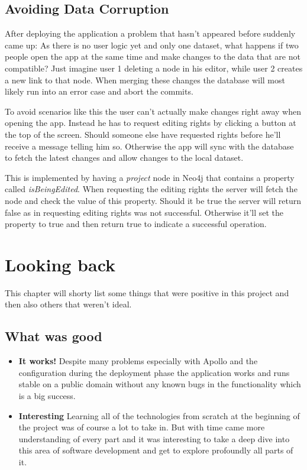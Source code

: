 \section{Avoiding Data Corruption}
After deploying the application a problem that hasn't appeared before suddenly came up: As there is no user logic yet and only one dataset, what happens if two people open the app at the same time and make changes to the data that are not compatible? Just imagine user 1 deleting a node in his editor, while user 2 creates a new link to that node. When merging these changes the database will most likely run into an error case and abort the commits.

To avoid scenarios like this the user can't actually make changes right away when opening the app. Instead he has to request editing rights by clicking a button at the top of the screen. Should someone else have requested rights before he'll receive a message telling him so. Otherwise the app will sync with the database to fetch the latest changes and allow changes to the local dataset.

This is implemented by having a \emph{project} node in Neo4j that contains a property called \emph{isBeingEdited}. When requesting the editing rights the server will fetch the node and check the value of this property. Should it be true the server will return false as in requesting editing rights was not successful. Otherwise it'll set the property to true and then return true to indicate a successful operation.

\chapter{Looking back}
\label{chap:LB}
This chapter will shorty list some things that were positive in this project and then also others that weren't ideal.

\section{What was good}
\begin{itemize}
\item \textbf{It works!} Despite many problems especially with Apollo and the configuration during the deployment phase the application works and runs stable on a public domain without any known bugs in the functionality which is a big success.

\item \textbf{Interesting} Learning all of the technologies from scratch at the beginning of the project was of course a lot to take in. But with time came more understanding of every part and it was interesting to take a deep dive into this area of software development and get to explore profoundly all parts of it.
\end{itemize}

